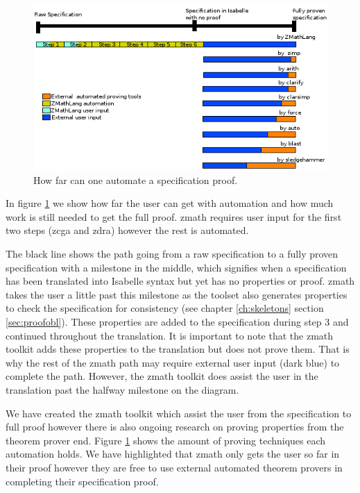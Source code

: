 \begin{figure}[H]
 \begin{center}
 \includegraphics [scale=0.75]{Figures/Design/timeline.png}
 \caption{How far can one automate a specification proof.}
 \label{fig:timeline}
\end{center}
\end{figure} 

In figure \ref{fig:timeline} we show how far the user can get with automation and how much work is still needed to get the full proof. \Gls{zmath} requires user input for the first two steps (\gls{zcga} and \gls{zdra}) however the rest is automated.

The black line shows the path going from a raw specification to a fully proven specification with a milestone in the middle, which signifies when a specification has been translated into Isabelle syntax but yet has no properties or proof. \Gls{zmath} takes the user a little past this milestone as the toolset also generates properties to check the specification for consistency (see chapter \ref{ch:skeletons} section \ref{sec:proofobl}). These properties are added to the specification during step 3 and continued throughout the translation. It is important to note that the \gls{zmath} toolkit adds these properties to the translation but does not prove them. That is why the rest of the \gls{zmath} path may require external user input (dark blue) to complete the path. However, the \gls{zmath} toolkit does assist the user in the translation past the halfway milestone on the diagram.

We have created the \Gls{zmath} toolkit which assist the user from the specification to full proof however there is also ongoing research on proving properties from the theorem prover end. Figure \ref{fig:timeline} shows the amount of proving techniques each automation holds. We have highlighted that \gls{zmath} only gets the user so far in their proof however they are free to use external automated theorem provers in completing their specification proof.

